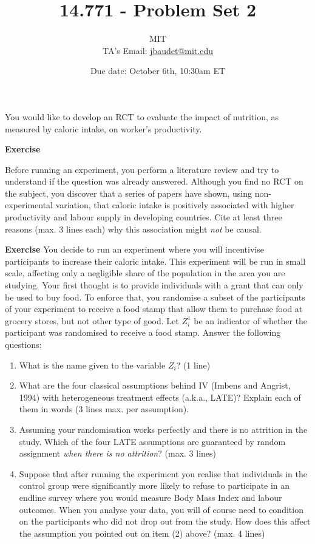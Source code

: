 \documentclass[10pt]{article}
\title{14.771 - Problem Set 2} %
\author{%
	\normalsize MIT \\ %
	\normalsize TA's Email: \href{mailto:jbaudet@mit.edu}{jbaudet@mit.edu} %
}
\date{Due date: October 6th, 10:30am ET} %
\newcounter{exercise}
\newenvironment{exercise}%
{%
	\refstepcounter{exercise}%
	\textbf{Exercise \theexercise}%
	}%
{
 \par\vspace{\baselineskip}%
\noindent\ignorespacesafterend
}
\begin{document}
\maketitle

You would like to develop an RCT to evaluate the impact of nutrition, as measured by caloric intake, on worker's productivity.

\begin{exercise}
	Before running an experiment, you perform a literature review and try to understand if the question was already answered. Although you find no RCT on the subject, you discover that a series of papers have shown, using non-experimental variation, that caloric intake is positively associated with higher productivity and labour supply in developing countries. Cite at least three reasons (max. 3 lines each) why this association might \textit{not} be causal.
\end{exercise}


\begin{exercise}\label{indep}
	You decide to run an experiment where you will incentivise participants to increase their caloric intake. This experiment will be run in small scale, affecting only a negligible share of the population in the area you are studying.
	Your first thought is to provide individuals with a grant that can only be used to buy food. To enforce that, you randomise a subset of the participants of your experiment to receive a food stamp that allow them to purchase food at grocery stores, but not other type of good. Let $ Z^{1}_{i} $ be an indicator of whether the participant was randomised to receive a food stamp. Answer the following questions:
	\begin{enumerate}
		\item What is the name given to the variable $ Z_{i} $? (1 line)
		\item What are the four classical assumptions behind IV (Imbens and Angrist, 1994) with heterogeneous treatment effects (a.k.a., LATE)? Explain each of them in words (3 lines max. per assumption).
		\item Assuming your randomisation works perfectly and there is no attrition in the study. Which of the four LATE assumptions are guaranteed by random assignment \textit{when there is no attrition}? (max. 3 lines)
		\item Suppose that after running the experiment you realise that individuals in the control group were significantly more likely to refuse to participate in an endline survey where you would measure Body Mass Index and labour outcomes. When you analyse your data, you will of course need to condition on the participants who did not drop out from the study. How does this affect the assumption you pointed out on item (2) above? (max. 4 lines)
	\end{enumerate}
\end{exercise}
\end{document}
